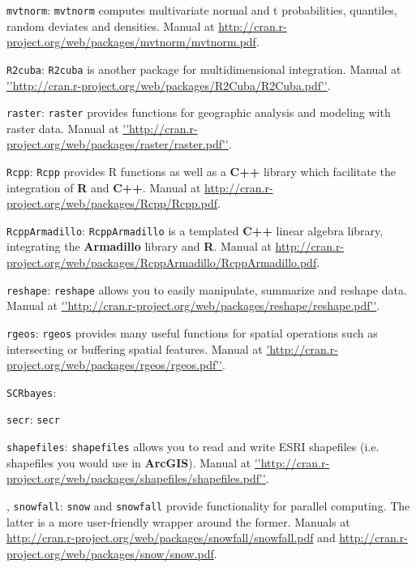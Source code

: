  {\flushleft \tt mvtnorm}:
\mbox{\tt mvtnorm} \citep{genz_etal:2012} computes multivariate normal and t probabilities, quantiles, random deviates and densities. Manual at \url{http://cran.r-project.org/web/packages/mvtnorm/mvtnorm.pdf}. 

 {\flushleft \tt R2cuba}: 
\mbox{\tt R2cuba} \citep{hahn_etal:2011} is another package for multidimensional integration. Manual at \url{''http://cran.r-project.org/web/packages/R2Cuba/R2Cuba.pdf''}. 

 {\flushleft \tt raster}: 
\mbox{\tt raster} \citep{hijmans_vanetten:2012} provides functions for geographic analysis and modeling with raster data. Manual at \url{''http://cran.r-project.org/web/packages/raster/raster.pdf''}. 

 {\flushleft \tt Rcpp}: 
\mbox{\tt Rcpp} \citep{eddelbuettel_francois:2011} provides R functions as well as a {\bf C++} library which facilitate the integration of {\bf R} and {\bf C++}. Manual at \url{http://cran.r-project.org/web/packages/Rcpp/Rcpp.pdf}. 

 {\flushleft \tt RcppArmadillo}:
\mbox{\tt RcppArmadillo} \citep{francois_etal:2011} is a templated {\bf C++} linear algebra library, integrating the {\bf Armadillo} library and {\bf R}. Manual at \url{http://cran.r-project.org/web/packages/RcppArmadillo/RcppArmadillo.pdf}. 

 {\flushleft \tt reshape}:
\mbox{\tt reshape} \citep{wickham_hadley:2007} allows you to easily manipulate, summarize and reshape data. Manual at \url{''http://cran.r-project.org/web/packages/reshape/reshape.pdf''}. 
  
{\flushleft \tt rgeos}: 
\mbox{\tt rgeos} \citep{bivand_rundel:2011} provides many useful functions for spatial operations such as intersecting or buffering spatial features. Manual at \url{'http://cran.r-project.org/web/packages/rgeos/rgeos.pdf''}. 

 {\flushleft \tt SCRbayes}:
\citep{russell_etal:2012}

{\flushleft \tt secr}:
\mbox{\tt secr} \citep{efford_etal:2009euring} 

{\flushleft \tt shapefiles}: 
\mbox{\tt shapefiles} \citep{stabler:2006} allows you to read and write ESRI shapefiles (i.e. shapefiles you would use in {\bf ArcGIS}). Manual at \url{''http://cran.r-project.org/web/packages/shapefiles/shapefiles.pdf''}. 

 {, {\tt snowfall}: }
\mbox{\tt snow} \citep{tierney_etal:2011} and \mbox{\tt snowfall} \citep{knaus:2010} provide functionality for parallel computing. The latter is a more user-friendly wrapper around the former. Manuals at \url{http://cran.r-project.org/web/packages/snowfall/snowfall.pdf} and \url{http://cran.r-project.org/web/packages/snow/snow.pdf}. 

